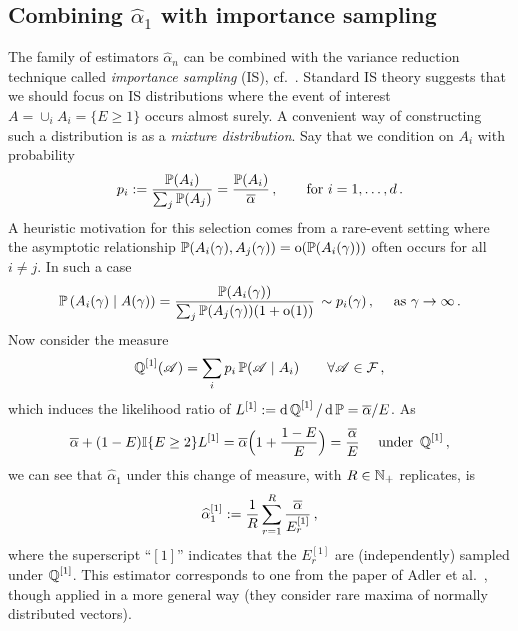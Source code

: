 \subsection{Combining $\hat{\alpha}_1$ with importance sampling} \label{scn:IS}

The family of estimators $\hat{\alpha}_n$ can be combined with the
variance reduction technique called \emph{importance sampling} (IS), cf.\ \cite{asmussen2007stochastic,glasserman2003monte}. Standard IS theory suggests that we should focus on IS distributions where the event of interest $A = \cup_i A_i = \{E \ge 1\}$ occurs almost surely.
A convenient way of constructing such a distribution is as a \emph{mixture distribution}. Say that we condition on $A_i$ with probability
\[ p_i := \frac{\operatorname{{\mathbb P}}(A_i)}{ \sum_j \operatorname{{\mathbb P}}(A_j) } = \frac{\operatorname{{\mathbb P}}(A_i)}{ \overline{\alpha}} \,,\qquad \text{for } i=1,\dots,d\,. \]
A heuristic motivation for this selection comes from a rare-event setting where the asymptotic relationship
$\operatorname{{\mathbb P}}(A_i(\gamma), A_j(\gamma))={\mathrm{o}}(\operatorname{{\mathbb P}}(A_i(\gamma)))$ often occurs for all $i\neq j$.
In such a case
\[
 \operatorname{{\mathbb P}}\left(A_i(\gamma) \mid A(\gamma) \right)
   = \dfrac{\operatorname{{\mathbb P}}(A_i(\gamma))}{\sum_j \operatorname{{\mathbb P}}(A_j(\gamma))(1 + {\mathrm{o}}(1))} \,   \sim p_i(\gamma) \,, \quad \text{ as } \gamma \to \infty\,. \]
Now consider the measure
\[ \operatorname{\mathbb Q}^{[1]}( \mathscr{A} ) = \sum_i p_i \operatorname{{\mathbb P}}( \mathscr{A} \mid A_i ) \qquad \forall \mathscr{A} \in \mathcal{F} \,,  \]
which induces the likelihood ratio of $L^{[1]} := \mathop{}\!\mathrm{d} \operatorname{\mathbb Q}^{[1]} / \mathop{}\!\mathrm{d} \operatorname{{\mathbb P}} = \overline{\alpha}/E$.
As
\[
  \overline{\alpha} + (1-E)\mathbb{I}\{ E \ge 2 \} L^{[1]}
  = \overline{\alpha} \Bigl( 1 + \frac{1-E}{E} \Bigr) \\
  = \frac{\overline{\alpha}}{E} \quad \text{ under } \operatorname{\mathbb Q}^{[1]}\, ,
\]
we can see that $\hat{\alpha}_1$ under this change of measure, with $R \in \mathbb{N}_+$ replicates, is
\begin{equation} \label{alpha_1_IS1}
  \widehat{\alpha}_{1}^{[1]} := \frac1R \sum_{r=1}^R \frac{\overline{\alpha}}{E_r^{[1]}} \,,
\end{equation}
where the superscript ``$[1]$'' indicates that the $E_r^{[1]}$ are (independently) sampled under $\operatorname{\mathbb Q}^{[1]}$. This estimator corresponds to one from the paper of Adler et al.\ \cite{adler1990introduction}, though applied in a  more general way (they consider rare maxima of normally distributed vectors).

